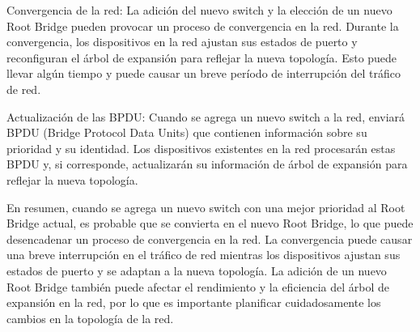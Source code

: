 \documentclass[a4paper]{article}
\begin{document}
\begin{enumerate}
Convergencia de la red: La adición del nuevo switch y la elección de un nuevo Root Bridge pueden provocar un proceso de convergencia en la red. Durante la convergencia, los dispositivos en la red ajustan sus estados de puerto y reconfiguran el árbol de expansión para reflejar la nueva topología. Esto puede llevar algún tiempo y puede causar un breve período de interrupción del tráfico de red.

Actualización de las BPDU: Cuando se agrega un nuevo switch a la red, enviará BPDU (Bridge Protocol Data Units) que contienen información sobre su prioridad y su identidad. Los dispositivos existentes en la red procesarán estas BPDU y, si corresponde, actualizarán su información de árbol de expansión para reflejar la nueva topología.

En resumen, cuando se agrega un nuevo switch con una mejor prioridad al Root Bridge actual, es probable que se convierta en el nuevo Root Bridge, lo que puede desencadenar un proceso de convergencia en la red. La convergencia puede causar una breve interrupción en el tráfico de red mientras los dispositivos ajustan sus estados de puerto y se adaptan a la nueva topología. La adición de un nuevo Root Bridge también puede afectar el rendimiento y la eficiencia del árbol de expansión en la red, por lo que es importante planificar cuidadosamente los cambios en la topología de la red.
\end{enumerate}
\end{document}

